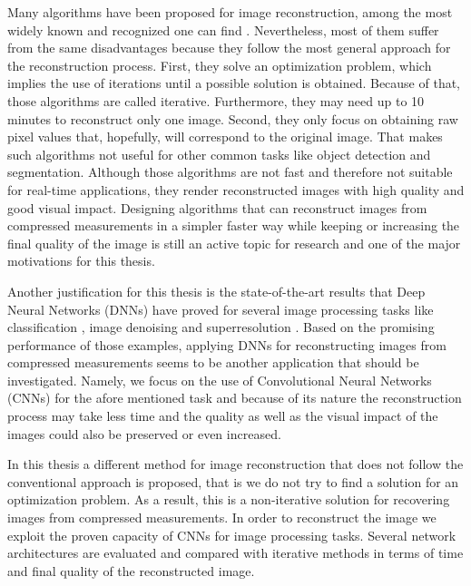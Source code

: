 Many algorithms have been proposed for image reconstruction, among the most widely known and recognized one can find \cite{metzler2014denoising,dong2014compressive, li2013efficient,mun2009block,chen2011compressed,fowler2011multiscale}. Nevertheless, most of them suffer from the same disadvantages because they follow the most general approach for the reconstruction process. First, they solve an optimization problem, which implies the use of iterations until a possible solution is obtained. Because of that, those algorithms are called iterative. Furthermore, they may need up to 10 minutes to reconstruct only one image. Second, they only focus on obtaining raw pixel values that, hopefully, will correspond to the original image. That makes such algorithms not useful for other common tasks like object detection and segmentation. Although those algorithms are not fast and therefore not suitable for real-time applications, they render reconstructed images with high quality and good visual impact. Designing algorithms that can reconstruct images from compressed measurements in a simpler faster way while keeping or increasing the final quality of the image is still an active topic for research and one of the major motivations for this thesis. \

Another justification for this thesis is the state-of-the-art results that Deep Neural Networks (DNNs) \cite{lecun2015deep} have proved for several image processing tasks like classification \cite{krizhevsky2012imagenet}, image denoising \cite{burger2012image} and superresolution \cite{dong2014learning}. Based on the promising performance of those examples, applying DNNs for reconstructing images from compressed measurements seems to be another application that should be investigated. Namely, we focus on the use of Convolutional Neural Networks (CNNs) for the afore mentioned task and because of its nature the reconstruction process may take less time and the quality as well as the visual impact of the images could also be preserved or even increased.  

In this thesis a different method for image reconstruction that does not follow the conventional approach is proposed, that is we do not try to find a solution for an optimization problem. As a result, this is a non-iterative solution for recovering images from compressed measurements. In order to reconstruct the image we exploit the proven capacity of CNNs for image processing tasks. Several network architectures are evaluated and compared with iterative methods in terms of time and final quality of the reconstructed image.

